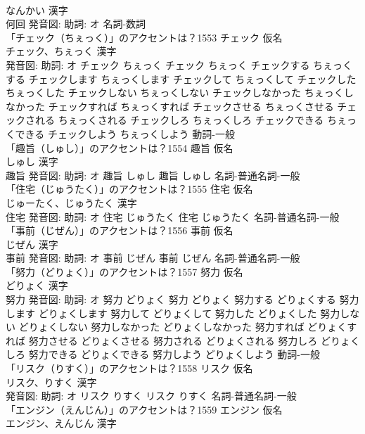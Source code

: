 \documentclass[8pt]{extreport}
\begin{document}
\begin{CJK}{UTF8}{min}
\\	なんかい 漢字　
\\	何回 発音図: 助詞: オ							名詞-数詞 
\\	「チェック（ちぇっく）」のアクセントは？1553	チェック 仮名　
\\	チェック、ちぇっく 漢字　
\\	発音図: 助詞: オ	チェック ちぇっく		チェック ちぇっく チェックする ちぇっくする チェックします ちぇっくします チェックして ちぇっくして チェックした ちぇっくした チェックしない ちぇっくしない チェックしなかった ちぇっくしなかった チェックすれば ちぇっくすれば チェックさせる ちぇっくさせる チェックされる ちぇっくされる チェックしろ ちぇっくしろ チェックできる ちぇっくできる チェックしよう ちぇっくしよう				動詞-一般 
\\	「趣旨（しゅし）」のアクセントは？1554	趣旨 仮名　
\\	しゅし 漢字　
\\	趣旨 発音図: 助詞: オ	趣旨 しゅし		趣旨 しゅし				名詞-普通名詞-一般 
\\	「住宅（じゅうたく）」のアクセントは？1555	住宅 仮名　
\\	じゅーたく、じゅうたく 漢字　
\\	住宅 発音図: 助詞: オ	住宅 じゅうたく		住宅 じゅうたく				名詞-普通名詞-一般 
\\	「事前（じぜん）」のアクセントは？1556	事前 仮名　
\\	じぜん 漢字　
\\	事前 発音図: 助詞: オ	事前 じぜん		事前 じぜん				名詞-普通名詞-一般 
\\	「努力（どりょく）」のアクセントは？1557	努力 仮名　
\\	どりょく 漢字　
\\	努力 発音図: 助詞: オ	努力 どりょく		努力 どりょく 努力する どりょくする 努力します どりょくします 努力して どりょくして 努力した どりょくした 努力しない どりょくしない 努力しなかった どりょくしなかった 努力すれば どりょくすれば 努力させる どりょくさせる 努力される どりょくされる 努力しろ どりょくしろ 努力できる どりょくできる 努力しよう どりょくしよう				動詞-一般 
\\	「リスク（りすく）」のアクセントは？1558	リスク 仮名　
\\	リスク、りすく 漢字　
\\	発音図: 助詞: オ	リスク りすく		リスク りすく				名詞-普通名詞-一般 
\\	「エンジン（えんじん）」のアクセントは？1559	エンジン 仮名　
\\	エンジン、えんじん 漢字　

\end{CJK}
\end{document}
